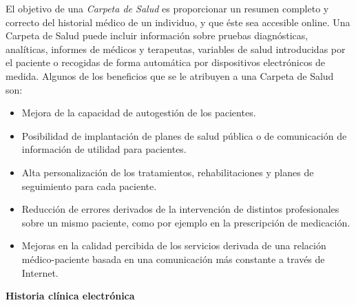 El objetivo de una \textit{Carpeta de Salud} es proporcionar un resumen completo y correcto del historial médico de un individuo, y que éste sea accesible online.
Una Carpeta de Salud puede incluir información sobre pruebas diagnósticas, analíticas, informes de médicos y terapeutas,
 variables de salud introducidas por el paciente o recogidas de forma automática por dispositivos electrónicos de medida.
Algunos de los beneficios que se le atribuyen a una Carpeta de Salud son:
	\begin{itemize}
        \item Mejora de la capacidad de autogestión de los pacientes.
	    \item Posibilidad de implantación de planes de salud pública o de comunicación de información de utilidad para pacientes.
	    \item Alta personalización de los tratamientos, rehabilitaciones y planes de seguimiento para cada paciente.
	    \item Reducción de errores derivados de la intervención de distintos profesionales sobre un mismo paciente, como por ejemplo en la prescripción de medicación.
	    \item Mejoras en la calidad percibida de los servicios derivada de una relación médico-paciente basada en una comunicación más constante a través de Internet.
	\end{itemize}


\textbf{Historia clínica electrónica}


